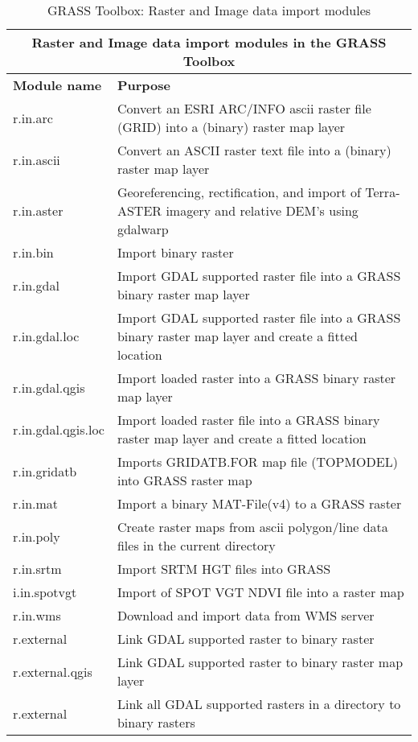 \begin{table}[H]
\centering
 \begin{tabular}{|p{2.5cm}|p{11.5cm}|}
  \hline \multicolumn{2}{|c|}{\textbf{Raster and Image data import modules in the GRASS
  Toolbox}} \\ 
  \hline \textbf{Module name} & \textbf{Purpose} \\
  \hline r.in.arc & Convert an ESRI ARC/INFO ascii raster file (GRID) into a
  (binary) raster map layer\\
  \hline r.in.ascii & Convert an ASCII raster text file into a (binary)
  raster map layer \\
  \hline r.in.aster & Georeferencing, rectification, and import of
  Terra-ASTER imagery and relative DEM's using gdalwarp \\
  \hline r.in.bin & Import binary raster \\
  \hline r.in.gdal &  Import GDAL supported raster file into a GRASS binary
  raster map layer \\
  \hline r.in.gdal.loc &  Import GDAL supported raster file into a GRASS
  binary raster map layer and create a fitted location \\
  \hline r.in.gdal.qgis & Import loaded raster into a GRASS binary raster map
  layer \\
  \hline r.in.gdal.qgis.loc &  Import loaded raster file into a GRASS binary
  raster map layer and create a fitted location \\
  \hline r.in.gridatb & Imports GRIDATB.FOR map file (TOPMODEL) into GRASS
  raster map \\
  \hline r.in.mat  & Import a binary MAT-File(v4) to a GRASS raster  \\
  \hline r.in.poly  &  Create raster maps from ascii polygon/line data files
  in the current directory \\
  \hline r.in.srtm  & Import SRTM HGT files into GRASS \\
  \hline i.in.spotvgt & Import of SPOT VGT NDVI file into a raster map \\
  \hline r.in.wms & Download and import data from WMS server \\
  \hline r.external & Link GDAL supported raster to binary raster \\
  \hline r.external.qgis & Link GDAL supported raster to binary raster map layer \\
  \hline r.external & Link all GDAL supported rasters in a directory to binary rasters  \\
  \hline
\end{tabular}
\caption{GRASS Toolbox: Raster and Image data import modules}
\end{table}

